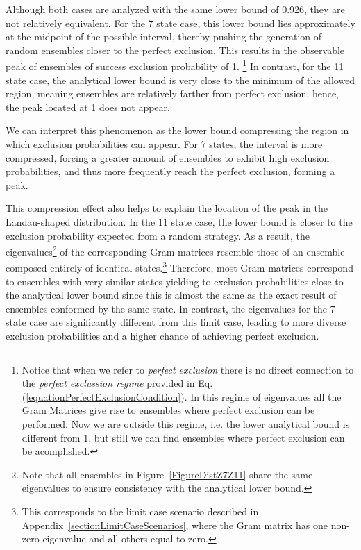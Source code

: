 \documentclass[12pt,letterpaper]{article}
\begin{document}
Although both cases are analyzed with the same lower bound of 0.926, they are not relatively equivalent. For the 7 state case, this lower bound lies approximately at the midpoint of the possible interval, thereby pushing the generation of random ensembles closer to the perfect exclusion. This results in the observable peak of ensembles of success exclusion probability of 1. \footnote{Notice that when we refer to \emph{perfect exclusion} there is no direct connection to the \emph{perfect exclussion regime} provided in Eq. (\ref{equationPerfectExclusionCondition}). In this regime of eigenvalues all the Gram Matrices give rise to ensembles where perfect exclusion can be performed. Now we are outside this regime, i.e. the lower analytical bound is different from 1, but still we can find ensembles where perfect exclusion can be acomplished.} In contrast, for the 11 state case, the analytical lower bound is very close to the minimum of the allowed region, meaning ensembles are relatively farther from perfect exclusion, hence, the peak located at 1 does not appear.

We can interpret this phenomenon as the lower bound compressing the region in which exclusion probabilities can appear. For 7 states, the interval is more compressed, forcing a greater amount of ensembles to exhibit high exclusion probabilities, and thus more frequently reach the perfect exclusion, forming a peak. 

This compression effect also helps to explain the location of the peak in the Landau-shaped distribution. In the 11 state case, the lower bound is closer to the exclusion probability expected from a random strategy. As a result, the eigenvalues\footnote{Note that all ensembles in Figure~\ref{FigureDistZ7Z11} share the same eigenvalues to ensure consistency with the analytical lower bound.} of the corresponding Gram matrices resemble those of an ensemble composed entirely of identical states.\footnote{This corresponds to the limit case scenario described in Appendix~\ref{sectionLimitCaseScenarios}, where the Gram matrix has one non-zero eigenvalue and all others equal to zero.} Therefore, most Gram matrices correspond to ensembles with very similar states yielding to exclusion probabilities close to the analytical lower bound since this is almost the same as the exact result of ensembles conformed by the same state. In contrast, the eigenvalues for the 7 state case are significantly different from this limit case, leading to more diverse exclusion probabilities and a higher chance of achieving perfect exclusion.
\end{document}
